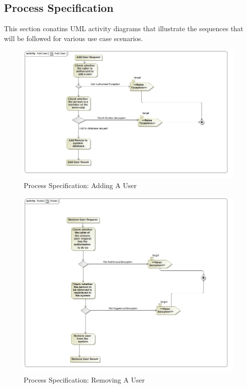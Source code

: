 \documentclass[a4paper]{article}
\begin{document}
    \subsection{Process Specification}
	This section conatins UML activity diagrams that illustrate the sequences that will be followed for various use case scenarios.
	\begin{figure}[H]
	    \centering
	    \includegraphics[width=\textwidth]{../Assignment1/AddUser.jpg}
	    \caption{Process Specification: Adding A User}
	\end{figure}
	\begin{figure}[H]
	    \centering
	    \includegraphics[width=\textwidth]{../Assignment1/removeUser.jpg}
	    \caption{Process Specification: Removing A User}
	\end{figure}
\end{document}
